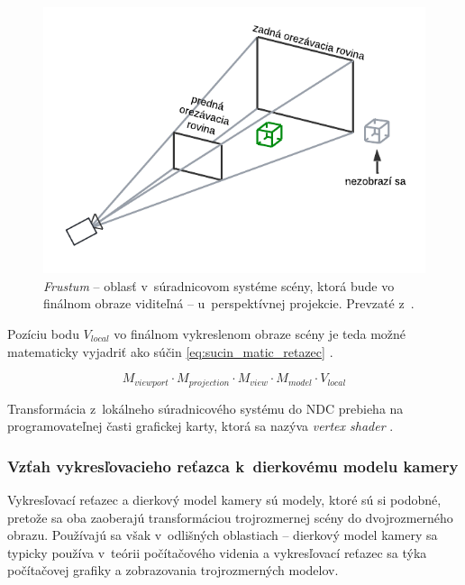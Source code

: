 \begin{figure}[h!]
    \centering
    \includegraphics[width=0.6\linewidth]{text_prace/obrazky-figures/perspektivna_projekcia_frustum.pdf}
    \caption[Frustum u~perspektívnej projekcie.]{\emph{Frustum} -- oblasť v~súradnicovom systéme scény, ktorá bude vo finálnom obraze viditeľná -- u~perspektívnej projekcie. Prevzaté z~\cite{de_vries_coordinate_systems}.}
    \label{fig:perspektivna_projekcia_frustum}
\end{figure}

Pozíciu bodu $V_{local}$ vo finálnom vykreslenom obraze scény je teda možné matematicky vyjadriť ako súčin \ref{eq:sucin_matic_retazec} \cite{de_vries_coordinate_systems}.

\begin{equation}
M_{viewport} \cdot M_{projection} \cdot M_{view} \cdot M_{model} \cdot V_{local}
\label{eq:sucin_matic_retazec}
\end{equation}

Transformácia z~lokálneho súradnicového systému do NDC prebieha na programovateľnej časti grafickej karty, ktorá sa nazýva \emph{vertex shader} \cite{de_vries_coordinate_systems}.

\subsubsection{Vzťah vykresľovacieho reťazca k~dierkovému modelu kamery}

Vykresľovací reťazec a dierkový model kamery sú modely, ktoré sú si podobné, pretože sa oba zaoberajú transformáciou trojrozmernej scény do dvojrozmerného obrazu. Používajú sa však v~odlišných oblastiach -- dierkový model kamery sa typicky používa v~teórii počítačového videnia a vykresľovací reťazec sa týka počítačovej grafiky a zobrazovania trojrozmerných modelov.

